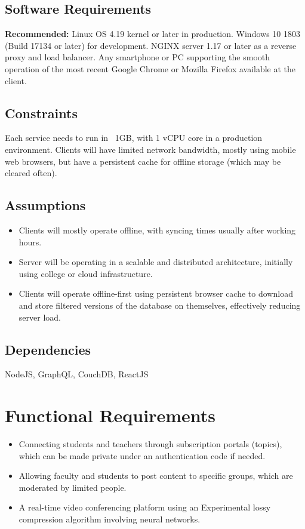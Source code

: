 \subsection{Software Requirements}

\textbf{Recommended:} 
Linux OS 4.19 kernel or later in production.
Windows 10 1803 (Build 17134 or later) for development.
NGINX server 1.17 or later as a reverse proxy and load balancer.
Any smartphone or PC supporting the smooth operation of the most recent 
Google Chrome or Mozilla Firefox available at the client.

\subsection{Constraints}

Each service needs to run in ~1GB, with 1 vCPU core in a production environment.
Clients will have limited network bandwidth, mostly using mobile web browsers, but 
have a persistent cache for offline storage (which may be cleared often).

\subsection{Assumptions}

\begin{itemize}
    \item Clients will mostly operate offline, with syncing times usually after working hours.
    \item Server will be operating in a scalable and distributed architecture, 
    initially using college or cloud infrastructure.
    \item Clients will operate offline-first using persistent browser cache to download and store filtered versions of the database on themselves, effectively reducing server load.
\end{itemize}

\subsection{Dependencies}

NodeJS, GraphQL, CouchDB, ReactJS

\section{Functional Requirements}

\begin{itemize}
    \item Connecting students and teachers through subscription portals (topics), 
    which can be made private under an authentication code if needed.
    \item Allowing faculty and students to post content to specific groups, 
    which are moderated by limited people.
    \item A real-time video conferencing platform using an Experimental 
    lossy compression algorithm involving neural networks.
\end{itemize}


